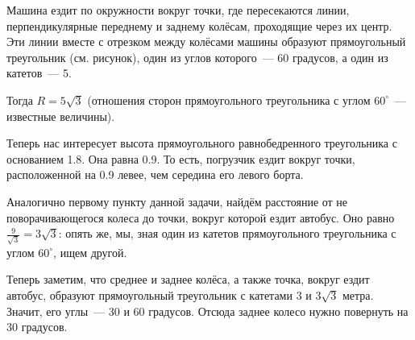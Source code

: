 \begin{itemize}

\itA Машина ездит по окружности вокруг точки, где пересекаются линии, перпендикулярные переднему и заднему колёсам, проходящие через их центр. Эти линии вместе с отрезком между колёсами машины образуют прямоугольный треугольник (см. рисунок), один из углов которого~— 60 градусов, а один из катетов~— \SI{5}{}.

Тогда $R = 5 \sqrt{3}$ (отношения сторон прямоугольного треугольника с углом $60^\circ$~— известные величины).

\begin{center}

\end{center}

\itB Теперь нас интересует высота прямоугольного равнобедренного треугольника с основанием \SI{1.8}{}. Она равна \SI{0.9}{}. То есть, погрузчик ездит вокруг точки, расположенной на \SI{0.9}{} левее, чем середина его левого борта.

\itC Аналогично первому пункту данной задачи, найдём расстояние от не поворачивающегося колеса до точки, вокруг которой ездит автобус. Оно равно $\tfrac{9}{\sqrt{3}} = 3\sqrt{3}$: опять же, мы, зная один из катетов прямоугольного треугольника с углом $60^\circ$, ищем другой.

Теперь заметим, что среднее и заднее колёса, а также точка, вокруг ездит автобус, образуют прямоугольный треугольник с катетами $3$ и $3\sqrt{3}$ метра. Значит, его углы~— 30 и 60 градусов. Отсюда заднее колесо нужно повернуть на 30 градусов.
\end{itemize}